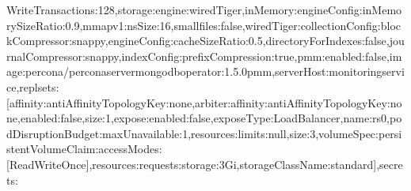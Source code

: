 \documentclass[letterpaper,10pt,english]{sphinxmanual}
\begin{document}
\begin{sphinxVerbatim}[commandchars=\\\{\}]
WriteTransactions\PYGZbs{}\PYGZdq{}:128\PYGZcb{},\PYGZbs{}\PYGZdq{}storage\PYGZbs{}\PYGZdq{}:\PYGZob{}\PYGZbs{}\PYGZdq{}engine\PYGZbs{}\PYGZdq{}:\PYGZbs{}\PYGZdq{}wiredTiger\PYGZbs{}\PYGZdq{},\PYGZbs{}\PYGZdq{}inMemory\PYGZbs{}\PYGZdq{}:\PYGZob{}\PYGZbs{}\PYGZdq{}engineConfig\PYGZbs{}\PYGZdq{}:\PYGZob{}\PYGZbs{}\PYGZdq{}inMemorySizeRatio\PYGZbs{}\PYGZdq{}:0.9\PYGZcb{}\PYGZcb{},\PYGZbs{}\PYGZdq{}mmapv1\PYGZbs{}\PYGZdq{}:\PYGZob{}\PYGZbs{}\PYGZdq{}nsSize\PYGZbs{}\PYGZdq{}:16,\PYGZbs{}\PYGZdq{}smallfiles\PYGZbs{}\PYGZdq{}:false\PYGZcb{},\PYGZbs{}\PYGZdq{}wiredTiger\PYGZbs{}\PYGZdq{}:\PYGZob{}\PYGZbs{}\PYGZdq{}collectionConfig\PYGZbs{}\PYGZdq{}:\PYGZob{}\PYGZbs{}\PYGZdq{}blockCompressor\PYGZbs{}\PYGZdq{}:\PYGZbs{}\PYGZdq{}snappy\PYGZbs{}\PYGZdq{}\PYGZcb{},\PYGZbs{}\PYGZdq{}engineConfig\PYGZbs{}\PYGZdq{}:\PYGZob{}\PYGZbs{}\PYGZdq{}cacheSizeRatio\PYGZbs{}\PYGZdq{}:0.5,\PYGZbs{}\PYGZdq{}directoryForIndexes\PYGZbs{}\PYGZdq{}:false,\PYGZbs{}\PYGZdq{}journalCompressor\PYGZbs{}\PYGZdq{}:\PYGZbs{}\PYGZdq{}snappy\PYGZbs{}\PYGZdq{}\PYGZcb{},\PYGZbs{}\PYGZdq{}indexConfig\PYGZbs{}\PYGZdq{}:\PYGZob{}\PYGZbs{}\PYGZdq{}prefixCompression\PYGZbs{}\PYGZdq{}:true\PYGZcb{}\PYGZcb{}\PYGZcb{}\PYGZcb{},\PYGZbs{}\PYGZdq{}pmm\PYGZbs{}\PYGZdq{}:\PYGZob{}\PYGZbs{}\PYGZdq{}enabled\PYGZbs{}\PYGZdq{}:false,\PYGZbs{}\PYGZdq{}image\PYGZbs{}\PYGZdq{}:\PYGZbs{}\PYGZdq{}percona/percona\PYGZhy{}server\PYGZhy{}mongodb\PYGZhy{}operator:1.5.0\PYGZhy{}pmm\PYGZbs{}\PYGZdq{},\PYGZbs{}\PYGZdq{}serverHost\PYGZbs{}\PYGZdq{}:\PYGZbs{}\PYGZdq{}monitoring\PYGZhy{}service\PYGZbs{}\PYGZdq{}\PYGZcb{},\PYGZbs{}\PYGZdq{}replsets\PYGZbs{}\PYGZdq{}:[\PYGZob{}\PYGZbs{}\PYGZdq{}affinity\PYGZbs{}\PYGZdq{}:\PYGZob{}\PYGZbs{}\PYGZdq{}antiAffinityTopologyKey\PYGZbs{}\PYGZdq{}:\PYGZbs{}\PYGZdq{}none\PYGZbs{}\PYGZdq{}\PYGZcb{},\PYGZbs{}\PYGZdq{}arbiter\PYGZbs{}\PYGZdq{}:\PYGZob{}\PYGZbs{}\PYGZdq{}affinity\PYGZbs{}\PYGZdq{}:\PYGZob{}\PYGZbs{}\PYGZdq{}antiAffinityTopologyKey\PYGZbs{}\PYGZdq{}:\PYGZbs{}\PYGZdq{}none\PYGZbs{}\PYGZdq{}\PYGZcb{},\PYGZbs{}\PYGZdq{}enabled\PYGZbs{}\PYGZdq{}:false,\PYGZbs{}\PYGZdq{}size\PYGZbs{}\PYGZdq{}:1\PYGZcb{},\PYGZbs{}\PYGZdq{}expose\PYGZbs{}\PYGZdq{}:\PYGZob{}\PYGZbs{}\PYGZdq{}enabled\PYGZbs{}\PYGZdq{}:false,\PYGZbs{}\PYGZdq{}exposeType\PYGZbs{}\PYGZdq{}:\PYGZbs{}\PYGZdq{}LoadBalancer\PYGZbs{}\PYGZdq{}\PYGZcb{},\PYGZbs{}\PYGZdq{}name\PYGZbs{}\PYGZdq{}:\PYGZbs{}\PYGZdq{}rs0\PYGZbs{}\PYGZdq{},\PYGZbs{}\PYGZdq{}podDisruptionBudget\PYGZbs{}\PYGZdq{}:\PYGZob{}\PYGZbs{}\PYGZdq{}maxUnavailable\PYGZbs{}\PYGZdq{}:1\PYGZcb{},\PYGZbs{}\PYGZdq{}resources\PYGZbs{}\PYGZdq{}:\PYGZob{}\PYGZbs{}\PYGZdq{}limits\PYGZbs{}\PYGZdq{}:null\PYGZcb{},\PYGZbs{}\PYGZdq{}size\PYGZbs{}\PYGZdq{}:3,\PYGZbs{}\PYGZdq{}volumeSpec\PYGZbs{}\PYGZdq{}:\PYGZob{}\PYGZbs{}\PYGZdq{}persistentVolumeClaim\PYGZbs{}\PYGZdq{}:\PYGZob{}\PYGZbs{}\PYGZdq{}accessModes\PYGZbs{}\PYGZdq{}:[\PYGZbs{}\PYGZdq{}ReadWriteOnce\PYGZbs{}\PYGZdq{}],\PYGZbs{}\PYGZdq{}resources\PYGZbs{}\PYGZdq{}:\PYGZob{}\PYGZbs{}\PYGZdq{}requests\PYGZbs{}\PYGZdq{}:\PYGZob{}\PYGZbs{}\PYGZdq{}storage\PYGZbs{}\PYGZdq{}:\PYGZbs{}\PYGZdq{}3Gi\PYGZbs{}\PYGZdq{}\PYGZcb{}\PYGZcb{},\PYGZbs{}\PYGZdq{}storageClassName\PYGZbs{}\PYGZdq{}:\PYGZbs{}\PYGZdq{}standard\PYGZbs{}\PYGZdq{}\PYGZcb{}\PYGZcb{}\PYGZcb{}],\PYGZbs{}\PYGZdq{}secrets\PYGZbs{}\PYGZdq{}:\PYGZob
\end{sphinxVerbatim}
\end{document}
